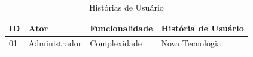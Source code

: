 \begin{table}[H]
	\begin{tabular}{|p{1.5cm}|p{2.7cm}|p{5.0cm}|p{5.0cm}|} 
	\hline
	\textbf{ID} & \textbf{Ator} & \textbf{Funcionalidade} & \textbf{História de Usuário} \\ \hline
	01 & Administrador & Complexidade & Nova Tecnologia \\ \hline
	\end{tabular}
	 \caption{Histórias de Usuário}
	 \label{tab:historias_de_usuario_participante}
\end{table}












